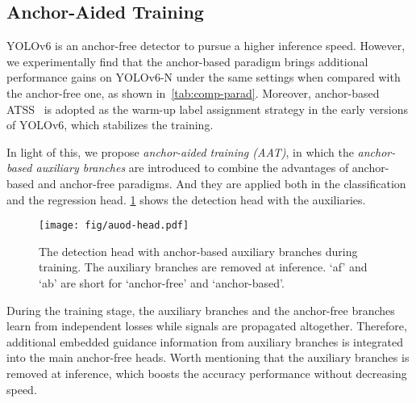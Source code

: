 \documentclass[10pt,twocolumn,letterpaper]{article}
\begin{document}
\subsection{Anchor-Aided Training}



  YOLOv6 is an anchor-free detector to pursue a higher inference speed. However, we experimentally find that the anchor-based paradigm brings additional performance gains on YOLOv6-N under the same settings when compared with the anchor-free one, as shown in~\cref{tab:comp-parad}. Moreover, anchor-based ATSS~\cite{zhang2020atss} is adopted as the warm-up label assignment strategy in the early versions of YOLOv6, which stabilizes the training.
  
  \begin{table}[ht]
  \centering
  \caption{Comparisons of the anchor-free and the anchor-based paradigms on YOLOv6-N.}
  \label{tab:comp-parad}
\end{table}

  In light of this, we propose \emph{anchor-aided training (AAT)}, in which the \emph{anchor-based auxiliary branches} are introduced to combine the advantages of anchor-based and anchor-free paradigms. And they are applied both in the classification and the regression head. \cref{fig:auod} shows the detection head with the auxiliaries.
  

\begin{figure}[htp]
  \centering
  \texttt{[image: fig/auod-head.pdf]}
  \caption{The detection head with anchor-based auxiliary branches during training. The auxiliary branches are removed at inference. `af' and `ab' are short for `anchor-free' and `anchor-based'. }
  \label{fig:auod}
\end{figure}

  During the training stage, the auxiliary branches and the anchor-free branches learn from independent losses while signals are propagated altogether. Therefore, additional embedded guidance information from auxiliary branches is integrated into the main anchor-free heads. Worth mentioning that the auxiliary branches is removed at inference, which boosts the accuracy performance without decreasing speed.
  
\end{document}
